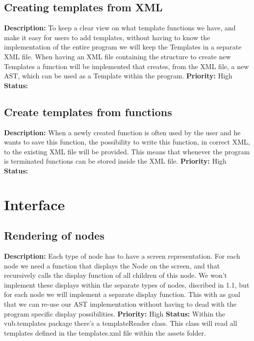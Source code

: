 \documentclass[a4paper,12pt]{report}
\begin{document}
\subsection{Creating templates from XML}
\textbf{Description: } To keep a clear view on what template functions we have, and make it easy for users to add templates, without having to know the implementation
of the entire program we will keep the Templates in a separate XML file. When having an XML file containing the structure to create new Templates a function will be implemented that creates, from the XML file, a new AST, which 
can be used as a Template within the program.\newline
\textbf{Priority:} High \newline
\textbf{Status: } \newline
\subsection{Create templates from functions}
\textbf{Description: } When a newly created function is often used by the user and he wants to save this function, the possibility to write this function, in correct XML, to
the existing XML file will be provided. This means that whenever the program is terminated functions can be stored inside the XML file.\newline
\textbf{Priority:} High \newline
\textbf{Status: } \newline
\section{Interface}
\subsection{Rendering of nodes}
\textbf{Description: }Each type of node has to have a screen representation. For each node we need a function that displays the Node on the screen, and 
that recursively calls the display function of all children of this node. We won't implement these displays within the separate types of nodes, discribed in 1.1, but 
for each node we will implement a separate display function. This with as goal that we can re-use our AST implementation without having to dead
with the program specific display possibilities.  \newline
\textbf{Priority:} High \newline
\textbf{Status: } Within the vub.templates package there's a templateReader class. This class will read all templates defined in the 
templates.xml file within the assets folder. \newline
\end{document}
